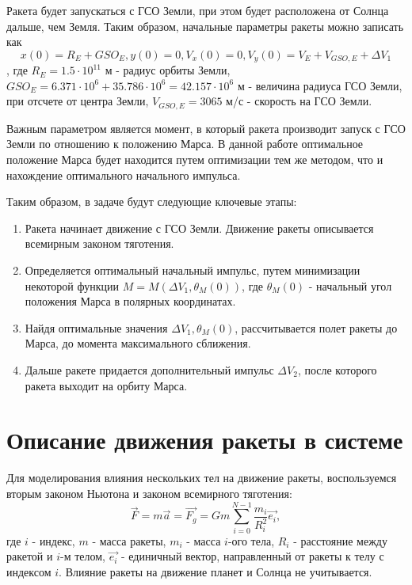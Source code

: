 Ракета будет запускаться с ГСО Земли, при этом будет расположена от Солнца дальше, чем Земля. Таким образом, начальные
параметры ракеты можно записать как 
\begin{equation}
		x(0) = R_E + GSO_E, y(0) = 0, V_x(0)=0, V_y(0) = V_E + V_{GSO, E} + \Delta V_1
\end{equation}
, где $R_E=1.5 \cdot 10^{11}$ м - радиус орбиты Земли, $GSO_E = 6.371 \cdot 10^6 + 35.786 \cdot 10^6 = 42.157 \cdot 10^6$ м -
величина радиуса ГСО Земли, при отсчете от центра Земли, $V_{GSO, E} = 3065$ м/с - скорость на ГСО Земли.

Важным параметром является момент, в который ракета производит запуск с ГСО Земли по отношению к положению Марса.
В данной работе оптимальное положение Марса будет находится путем оптимизации тем же методом, что и нахождение оптимального
начального импульса.

Таким образом, в задаче будут следующие ключевые этапы:
\begin{enumerate}
	\item Ракета начинает движение с ГСО Земли. Движение ракеты описывается всемирным законом тяготения.
	\item Определяется оптимальный начальный импульс, путем минимизации некоторой функции $M=M(\Delta V_1, \theta_M(0))$, 
	где $\theta_M(0)$ - начальный угол положения Марса в полярных координатах.
	\item Найдя оптимальные значения $\Delta V_1, \theta_M(0)$, рассчитывается полет ракеты до Марса, до момента максимального
	сближения.
	\item Дальше ракете придается дополнительный импульс $\Delta V_2$, после которого ракета выходит на орбиту Марса.
\end{enumerate}


\section{Описание движения ракеты в системе}
Для моделирования влияния нескольких тел на движение ракеты, воспользуемся вторым законом Ньютона и законом
всемирного тяготения:
\begin{equation}
	\vec{F} = m\vec{a} = \vec{F_g} = G m \sum_{i=0}^{N-1}\frac{m_i}{R_i^2}\vec{e_i},
\end{equation}
где $i$ - индекс, $m$ - масса ракеты, $m_i$ - масса $i$-ого тела, $R_i$ - расстояние между
ракетой и $i$-м телом, $\vec{e_i}$ - единичный вектор, направленный от ракеты к телу с индексом $i$.
Влияние ракеты на движение планет и Солнца не учитывается.

